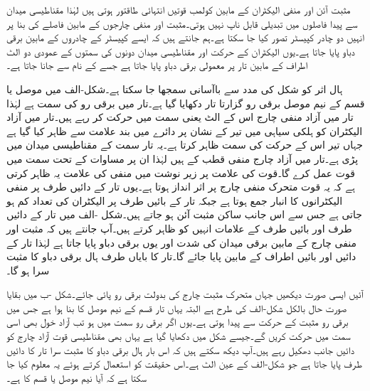 مثبت آئن اور منفی الیکٹران کے مابین کولمب قوتیں انتہائی طاقتور ہوتی ہیں لہٰذا مقناطیسی میدان سے پیدا فاصلوں میں تبدیلی قابل ناپ نہیں ہوتی۔مثبت اور منفی چارجوں کے مابین فاصلے کی بنا پر انہیں دو چادر کپیسٹر تصور کیا جا سکتا ہے۔ہم جانتے ہیں کہ ایسے کپیسٹر کے چادروں کے مابین برقی دباو پایا جاتا ہے۔یوں الیکٹران کے حرکت اور مقناطیسی میدان دونوں کی سمتوں کے عمودی دو الٹ اطراف کے مابین تار پر معمولی برقی دباو پایا جاتا ہے جسے  کے نام سے جانا جاتا ہے۔

ہال اثر کو شکل  کی مدد سے باآسانی سمجھا جا سکتا ہے۔شکل-الف میں موصل یا  قسم کے نیم موصل برقی رو گزارتا تار دکھایا گیا ہے۔تار میں برقی رو  کی سمت  ہے  لہٰذا تار میں آزاد منفی چارج اس کے الٹ یعنی  سمت  میں حرکت کر رہے ہیں۔تار میں آزاد الیکٹران کو ہلکی سیاہی میں تیر کے نشان پر دائرے میں بند  علامت سے ظاہر کیا گیا ہے جہاں تیر اس کے حرکت کی سمت ظاہر کرتا ہے۔یہ تار  سمت کے مقناطیسی میدان میں پڑی ہے۔تار میں آزاد چارج منفی قطب کے ہیں لہٰذا ان پر مساوات  کے تحت  سمت میں قوت  عمل کرے گا۔قوت کی علامت پر زیر نوشت میں منفی کی علامت یہ ظاہر کرتی ہے کہ یہ قوت متحرک منفی چارج پر اثر انداز ہوتا ہے۔یوں تار کے دائیں طرف پر منفی الیکٹرانوں کا انبار جمع ہوتا ہے جبکہ تار کے بائیں طرف پر الیکٹران کی تعداد کم ہو جاتی ہے جس سے اس جانب ساکن مثبت آئن  ہو جاتے ہیں۔شکل -الف میں تار کے دائیں طرف  اور بائیں طرف   کے علامات انہیں کو ظاہر کرتے ہیں۔آپ جانتے ہیں کہ مثبت اور  منفی چارج  کے مابین برقی میدان کی شدت  اور یوں برقی دباو پایا جاتا ہے لہٰذا تار کے دائیں اور بائیں اطراف کے مابین  پایا جائے گا۔تار کا بایاں طرف ہال برقی دباو کا مثبت سرا ہو گا۔

آئیں ایسی صورت دیکھیں جہاں متحرک مثبت چارج کی بدولت برقی رو پائی جائے۔شکل -ب میں بقایا صورت حال بالکل شکل-الف کی طرح ہے البتہ یہاں تار  قسم کے نیم موصل کا بنا ہوا ہے جس میں برقی رو مثبت  کے حرکت سے پیدا ہوتی ہے۔یوں اگر برقی رو  سمت میں ہو تب آزاد خول بھی اسی سمت میں حرکت کریں گے۔جیسے شکل میں دکھایا گیا ہے یہاں بھی مقناطیسی قوت آزاد چارج کو دائیں جانب دھکیل رہے ہیں۔آپ دیکھ سکتے ہیں کہ اس بار ہال برقی دباو کا مثبت سرا تار کا دائیں طرف پایا جاتا ہے جو شکل-الف کے عین الٹ ہے۔اس حقیقت کو استعمال کرتے ہوئے یہ معلوم کیا جا سکتا ہے کہ آیا  نیم موصل  یا  قسم کا ہے۔

